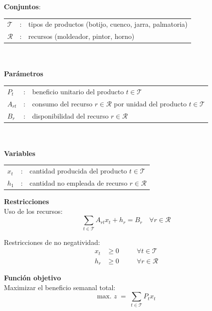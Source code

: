 \textbf{Conjuntos}:

\begin{tabular}{l c l}
    $\mathcal{T}$  & : & tipos de productos (botijo, cuenco, jarra, palmatoria) \\
    $\mathcal{R}$  & : & recursos (moldeador, pintor, horno)
\end{tabular}
\\
\\

\textbf{Parámetros}

\begin{tabular}{l c l}
    $P_t$       & : & beneficio unitario del producto $t \in \mathcal{T}$ \\
    $A_{rt}$    & : & consumo del recurso $r \in \mathcal{R}$ por unidad del producto $t \in \mathcal{T}$ \\
    $B_r$       & : & disponibilidad del recurso $r \in \mathcal{R}$ \\
\end{tabular}
\\
\\

\textbf{Variables}\mbox{}

\begin{tabular}{l c l}
    $x_t$  & : & cantidad producida del producto $t \in \mathcal{T}$ \\
    $h_1$  & : & cantidad no empleada de recurso $r \in \mathcal{R}$ \\
\end{tabular}

\textbf{Restricciones}\mbox{}\\

Uso de los recursos:
\begin{equation}
    \sum_{t \in \mathcal{T}} A_{rt} x_t + h_r =  B_r \quad \forall r \in \mathcal{R}
\end{equation}

Restricciones de no negatividad:
\begin{align}
x_t & \geq 0 \quad && \forall t \in \mathcal{T} \\
h_r & \geq 0 \quad && \forall r \in \mathcal{R}
\end{align}


\textbf{Función objetivo}\mbox{}\\

Maximizar el beneficio semanal total:
\begin{equation}
    \mbox{max. } z \;=\; \sum_{t \in \mathcal{T}} P_t x_t
\end{equation}






